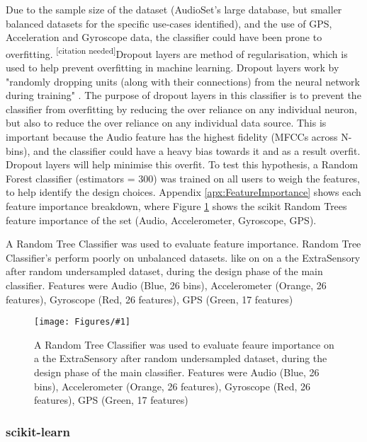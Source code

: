 \documentclass{UoNMCHA}
\newcommand{\citationneeded}{\textsuperscript{\color{blue} [citation needed]}}
\newcommand{\fref}[1] {Figure \ref{#1}}
\newcommand{\fFigure}[3]{
	\begin{figure}[h]
        \begin{center}  
            \texttt{[image: Figures/\#1]}  
            \caption{#2}
            \label{#1}
        \end{center}
	\end{figure}
}
\numberwithin{equation}{section}
\begin{document}
Due to the sample size of the dataset (AudioSet's large database, but smaller balanced datasets for the specific use-cases identified), and the use of GPS, Acceleration and Gyroscope data, the classifier could have been prone to overfitting. \citationneeded Dropout layers are method of regularisation, which is used to help prevent overfitting in machine learning. Dropout layers work by "randomly dropping units (along with their connections) from the neural network during training" \cite{witten2016data}. The purpose of dropout layers in this classifier is to prevent the classifier from overfitting by reducing the over reliance on any individual neuron, but also to reduce the over reliance on any individual data source. This is important because the Audio feature has the highest fidelity (MFCCs across N-bins), and the classifier could have a heavy bias towards it and as a result overfit. Dropout layers will help minimise this overfit. To test this hypothesis, a Random Forest classifier (estimators = 300) was trained on all users to weigh the features, to help identify the design choices. Appendix \ref{apx:FeatureImportance} shows each feature importance breakdown, where \fref{feature_important_just_combined_big_colour.png} shows the scikit Random Trees feature importance of the set (Audio, Accelerometer, Gyroscope, GPS).

A Random Tree Classifier was used to evaluate feature importance. Random Tree Classifier's perform poorly on unbalanced datasets. like on  on a the ExtraSensory after random undersampled dataset, during the design phase of the main classifier. Features were Audio (Blue, 26 bins), Accelerometer (Orange, 26 features), Gyroscope (Red, 26 features), GPS (Green, 17 features)

\fFigure{feature_important_just_combined_big_colour.png}{A Random Tree Classifier was used to evaluate feaure importance on a the ExtraSensory after random undersampled dataset, during the design phase of the main classifier. Features were Audio (Blue, 26 bins), Accelerometer (Orange, 26 features), Gyroscope (Red, 26 features), GPS (Green, 17 features)}{1}




\subsubsection{scikit-learn}
\end{document}
